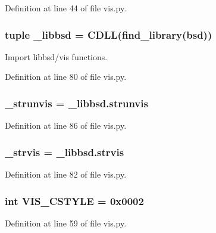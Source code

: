 Definition at line 44 of file vis.\+py.

\subsubsection[{\+\_\+libbsd}]{\setlength{\rightskip}{0pt plus 5cm}tuple \+\_\+libbsd = C\+D\+L\+L(find\+\_\+library(\textquotesingle{}bsd\textquotesingle{}))}\label{namespacevis_adad1e7eed134c2fbf46411c6772454a6}


Import libbsd/vis functions. 



Definition at line 80 of file vis.\+py.

\subsubsection[{\+\_\+strunvis}]{\setlength{\rightskip}{0pt plus 5cm}\+\_\+strunvis = \+\_\+libbsd.\+strunvis}\label{namespacevis_a76fd49edaf934bae009459f58b3cc296}


Definition at line 86 of file vis.\+py.

\subsubsection[{\+\_\+strvis}]{\setlength{\rightskip}{0pt plus 5cm}\+\_\+strvis = \+\_\+libbsd.\+strvis}\label{namespacevis_a3a7a390e31863808322b8b78909857e6}


Definition at line 82 of file vis.\+py.

\subsubsection[{V\+I\+S\+\_\+\+C\+S\+T\+Y\+L\+E}]{\setlength{\rightskip}{0pt plus 5cm}int V\+I\+S\+\_\+\+C\+S\+T\+Y\+L\+E = 0x0002}\label{namespacevis_adf6d8b066f3caec99a03c4b50f8312de}


Definition at line 59 of file vis.\+py.

